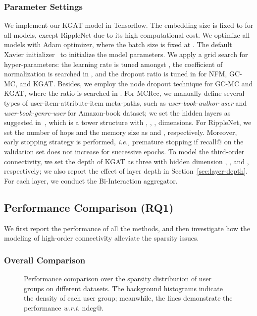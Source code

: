 \documentclass[sigconf]{acmart}
\newcommand{\ie}{\emph{i.e., }}
\newcommand{\wrt}{\emph{w.r.t. }}
\theoremstyle{definition}
\begin{document}
\subsubsection{\textbf{Parameter Settings}}\label{sec:experiment-settings}
We implement our KGAT model in Tensorflow.
The embedding size is fixed to  for all models, except RippleNet  due to its high computational cost.
We optimize all models with Adam optimizer, where the batch size is fixed at .
The default Xavier initializer~\cite{Xarvier} to initialize the model parameters.
We apply a grid search for hyper-parameters: the learning rate is tuned amongst , the coefficient of  normalization is searched in , and the dropout ratio is tuned in  for NFM, GC-MC, and KGAT.
Besides, we employ the node dropout technique for GC-MC and KGAT, where the ratio is searched in .
For MCRec, we manually define several types of user-item-attribute-item meta-paths, such as \emph{user-book-author-user} and \emph{user-book-genre-user} for Amazon-book dataset; we set the hidden layers as suggested in~\cite{MCRec}, which is a tower structure with , , ,  dimensions.
For RippleNet, we set the number of hops and the memory size as  and , respectively.
Moreover, early stopping strategy is performed, \ie premature stopping if recall@ on the validation set does not increase for  successive epochs.
To model the third-order connectivity, we set the depth of KGAT  as three with hidden dimension , , and , respectively; we also report the effect of layer depth in Section~\ref{sec:layer-depth}.
For each layer, we conduct the Bi-Interaction aggregator.



\subsection{Performance Comparison (RQ1)}
We first report the performance of all the methods, and then investigate how the modeling of high-order connectivity alleviate the sparsity issues.



\subsubsection{\textbf{Overall Comparison}}

\begin{figure*}[t]
\centering
{}
\vspace{-15pt}
\caption{Performance comparison over the sparsity distribution of user groups on different datasets.
The background histograms indicate the density of each user group; meanwhile, the lines demonstrate the performance \wrt ndcg@.}
\label{fig:sparsity}\vspace{-10pt}
\end{figure*}
\end{document}
